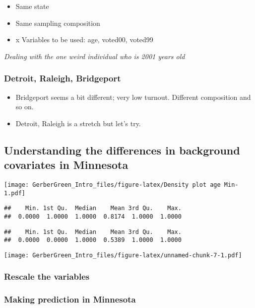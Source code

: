 \documentclass[]{article}
\begin{document}
\begin{itemize}
\item
  Same state
\item
  Same sampling composition
\item
  x Variables to be used: age, voted00, voted99
\end{itemize}

\emph{Dealing with the one weird individual who is 2001 years old}

\subsubsection{Detroit, Raleigh,
Bridgeport}\label{detroit-raleigh-bridgeport}

\begin{itemize}
\item
  Bridgeport seems a bit different; very low turnout. Different
  composition and so on.
\item
  Detroit, Raleigh is a stretch but let's try.
\end{itemize}

\subsection{Understanding the differences in background covariates in
Minnesota}\label{understanding-the-differences-in-background-covariates-in-minnesota}

\texttt{[image: GerberGreen\_Intro\_files/figure-latex/Density plot age Min-1.pdf]}

\begin{verbatim}
##    Min. 1st Qu.  Median    Mean 3rd Qu.    Max. 
##  0.0000  1.0000  1.0000  0.8174  1.0000  1.0000
\end{verbatim}

\begin{verbatim}
##    Min. 1st Qu.  Median    Mean 3rd Qu.    Max. 
##  0.0000  0.0000  1.0000  0.5389  1.0000  1.0000
\end{verbatim}

\texttt{[image: GerberGreen\_Intro\_files/figure-latex/unnamed-chunk-7-1.pdf]}

\subsubsection{Rescale the variables}\label{rescale-the-variables}

\subsubsection{Making prediction in
Minnesota}\label{making-prediction-in-minnesota}
\end{document}
